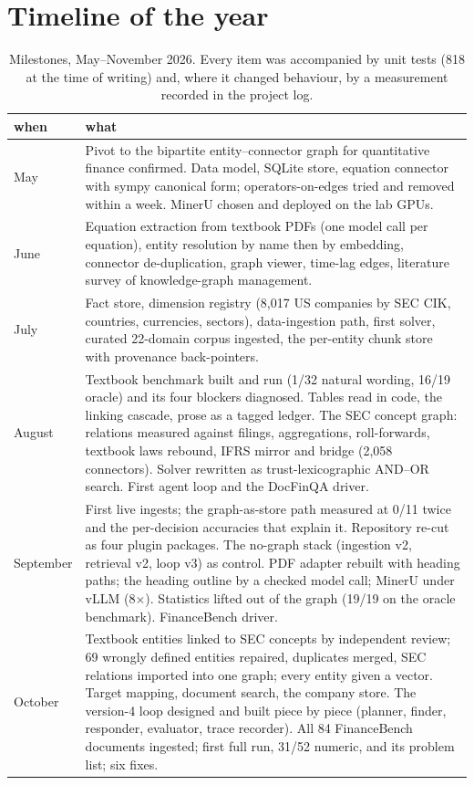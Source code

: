 \section{Timeline of the year}
\label{app:timeline}

\begin{table}[h]
\centering\small
\caption{Milestones, May--November 2026. Every item was accompanied by unit tests (818 at the time of writing) and, where it changed behaviour, by a measurement recorded in the project log.}
\begin{tabular}{p{18mm}p{132mm}}
\toprule
when & what \\
\midrule
May & Pivot to the bipartite entity--connector graph for quantitative finance confirmed. Data model, SQLite store, equation connector with sympy canonical form; operators-on-edges tried and removed within a week. MinerU chosen and deployed on the lab GPUs. \\
June & Equation extraction from textbook PDFs (one model call per equation), entity resolution by name then by embedding, connector de-duplication, graph viewer, time-lag edges, literature survey of knowledge-graph management. \\
July & Fact store, dimension registry (8,017 US companies by SEC CIK, countries, currencies, sectors), data-ingestion path, first solver, curated 22-domain corpus ingested, the per-entity chunk store with provenance back-pointers. \\
August & Textbook benchmark built and run (1/32 natural wording, 16/19 oracle) and its four blockers diagnosed. Tables read in code, the linking cascade, prose as a tagged ledger. The SEC concept graph: relations measured against filings, aggregations, roll-forwards, textbook laws rebound, IFRS mirror and bridge (2,058 connectors). Solver rewritten as trust-lexicographic AND--OR search. First agent loop and the DocFinQA driver. \\
September & First live ingests; the graph-as-store path measured at 0/11 twice and the per-decision accuracies that explain it. Repository re-cut as four plugin packages. The no-graph stack (ingestion v2, retrieval v2, loop v3) as control. PDF adapter rebuilt with heading paths; the heading outline by a checked model call; MinerU under vLLM (8$\times$). Statistics lifted out of the graph (19/19 on the oracle benchmark). FinanceBench driver. \\
October & Textbook entities linked to SEC concepts by independent review; 69 wrongly defined entities repaired, duplicates merged, SEC relations imported into one graph; every entity given a vector. Target mapping, document search, the company store. The version-4 loop designed and built piece by piece (planner, finder, responder, evaluator, trace recorder). All 84 FinanceBench documents ingested; first full run, 31/52 numeric, and its problem list; six fixes. \\

\end{tabular}
\end{table}
